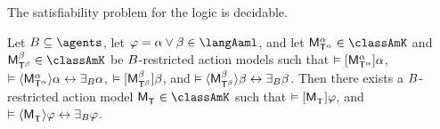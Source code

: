 \begin{corollary}
The satisfiability problem for the logic \logicAamlK{} is decidable.
\end{corollary}

\begin{lemma}\label{aaml-k-choice}
Let $\agentsB \subseteq \agents$, 
let $\phi = \alpha \lor \beta \in \langAaml$, and 
let $\aPModel[\alpha]{\aStatesT[\alpha]} \in \classAmK$ and $\aPModel[\beta]{\aStatesT[\beta]} \in \classAmK$ be $\agentsB$-restricted action models such that 
$\entails \actionA{\aPModel[\alpha]{\aStatesT[\alpha]}} \alpha$, 
$\entails \actionE{\aPModel[\alpha]{\aStatesT[\alpha]}} \alpha \iff \someactsBs \alpha$, 
$\entails \actionA{\aPModel[\beta]{\aStatesT[\beta]}} \beta$, and 
$\entails \actionE{\aPModel[\beta]{\aStatesT[\beta]}} \beta \iff \someactsBs \beta$.
Then there exists a $\agentsB$-restricted action model $\aPModel{\aStatesT} \in \classAmK$ such that 
$\entails \actionA{\aPModel{\aStatesT}} \phi$, and 
$\entails \actionE{\aPModel{\aStatesT}} \phi \iff \someactsBs \phi$.
\end{lemma}

